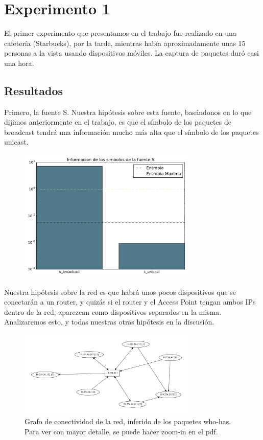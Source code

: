 \section{Experimento 1}

\PARstart El primer experimento que presentamos en el trabajo fue realizado en una cafetería (Starbucks), por la tarde, mientras había aproximadamente unas 15 personas a la vista usando dispositivos móviles. La captura de paquetes duró casi una hora.

\subsection{Resultados}

Primero, la fuente S. Nuestra hipótesis sobre esta fuente, basándonos en lo que dijimos anteriormente en el trabajo, es que el símbolo de los paquetes de broadcast tendrá una información mucho más alta que el símbolo de los paquetes unicast.

\begin{figure}[H]
  \centering
  \includegraphics[width=8.5cm]{exp_starbucks/grafico1.pdf}
  \caption{\normalfont }
\end{figure}

Nuestra hipótesis sobre la red es que habrá unos pocos dispositivos que se conectarán a un router, y quizás si el router y el Access Point tengan ambos IPs dentro de la red, aparezcan como dispositivos separados en la misma.
Analizaremos esto, y todas nuestras otras hipótesis en la discusión.

\begin{figure}[H]
  \centering
  \includegraphics[width=8.5cm]{exp_starbucks/grafico2.pdf}
  \caption{  \normalfont Grafo de conectividad de la red, inferido de los paquetes who-has. Para ver con mayor detalle, se puede hacer zoom-in en el pdf. }
\end{figure}

